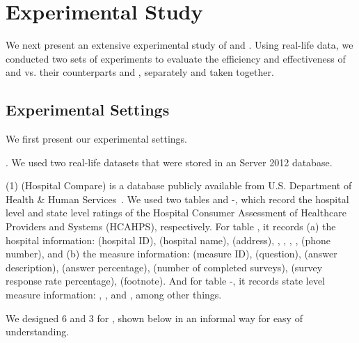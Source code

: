 



\section{Experimental Study}
\label{sec-exp}

We next present an extensive experimental study of \pCFDs and \pCINDs. Using real-life data, we conducted two sets of experiments to evaluate the efficiency and effectiveness of \pCFDs and \pCINDs vs. their counterparts \CFDs and \CINDs, separately and taken together.

\subsection{Experimental Settings}
We first present our experimental settings.

. We used two real-life datasets that were stored in an \SQL Server 2012 database.

\ni(1) \hosp (Hospital Compare) is a database publicly available from U.S. Department of Health %
\& Human Services~\cite{hosp}. We used two tables  and -, which record the hospital level and state level ratings of the Hospital Consumer Assessment of Healthcare Providers and Systems (HCAHPS), respectively.
%
For table , it records (a) the hospital information:  (hospital ID),  (hospital name),  (address), , , , ,  (phone number), and (b) the measure information:  (measure ID),  (question),  (answer description),  (answer percentage),  (number of completed surveys),  (survey response rate percentage),  (footnote).
%
And for table -, it records state level measure information: , ,  and , among other things.


We designed 6 \pCFDs and 3 \pCINDs for \hosp, shown below in an informal way for easy of understanding.

